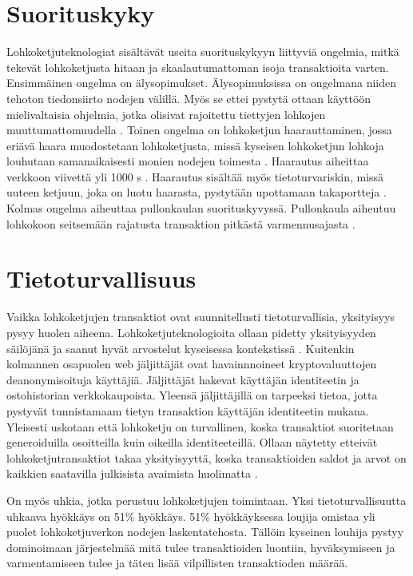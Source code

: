 \documentclass[utf8,bachelor]{gradu3}
\begin{document}
\section{Suorituskyky}
Lohkoketjuteknologiat sisältävät useita suorituskykyyn liittyviä ongelmia, mitkä tekevät lohkoketjusta hitaan ja skaalautumattoman isoja transaktioita varten.
Ensimmäinen ongelma on älysopimukset. Älysopimuksissa on ongelmana niiden tehoton tiedonsiirto nodejen välillä. Myös se ettei pystytä ottaan käyttöön mielivaltaisia ohjelmia, jotka olisivat rajoitettu tiettyjen lohkojen muuttumattomuudella \parencite{yang2019survey}.
Toinen ongelma on lohkoketjun haarauttaminen, jossa eriävä haara muodostetaan lohkoketjusta, missä kyseisen lohkoketjun lohkoja louhutaan samanaikaisesti monien nodejen toimesta \parencite{da2019analysis}. 
Haarautus aiheittaa verkkoon viivettä yli 1000 s \parencite{mivsic2019forks}.
Haarautus sisältää myös tietoturvariskin, missä uuteen ketjuun, joka on luotu haarasta, pystytään upottamaan takaportteja \parencite{wang2019corking}.
Kolmas ongelma aiheuttaa pullonkaulan suorituskyvyssä. Pullonkaula aiheutuu lohkokoon seitsemään rajatusta transaktion pitkästä varmennusajasta \parencite{yang2019survey}.


\section{Tietoturvallisuus}
Vaikka lohkoketjujen transaktiot ovat suunnitellusti tietoturvallisia, yksityisyys pysyy huolen aiheena.
Lohkoketjuteknologioita ollaan pidetty yksityisyyden säilöjänä ja saanut hyvät arvostelut kyseisessa kontekstissä \parencite{de2016interplay}.
Kuitenkin kolmannen osapuolen web jäljittäjät ovat havainnnoineet kryptovaluuttojen deanonymisoituja käyttäjiä. Jäljittäjät hakevat käyttäjän identiteetin ja ostohistorian verkkokaupoista. Yleensä jäljittäjillä on tarpeeksi tietoa, jotta pystyvät tunnistamaam tietyn transaktion käyttäjän identiteetin mukana. 
Yleisesti uskotaan että lohkoketju on turvallinen, koska transaktiot suoritetaan generoiduilla osoitteilla kuin oikeilla identiteeteillä.
Ollaan näytetty etteivät lohkoketjutransaktiot takaa yksityisyyttä, koska transaktioiden saldot ja arvot on kaikkien saatavilla julkisista avaimista huolimatta \parencite{kosba2016hawk}.

On myös uhkia, jotka perustuu lohkoketjujen toimintaan. Yksi tietoturvallisuutta uhkaava hyökkäys on 51\% hyökkäys. 51\% hyökkäyksessa loujija omistaa yli puolet lohkoketjuverkon nodejen laskentatehosta. Tällöin kyseinen louhija pystyy dominoimaan järjestelmää mitä tulee transaktioiden luontiin, hyväksymiseen ja varmentamiseen tulee ja täten lisää vilpillisten transaktioden määrää.
\end{document}
